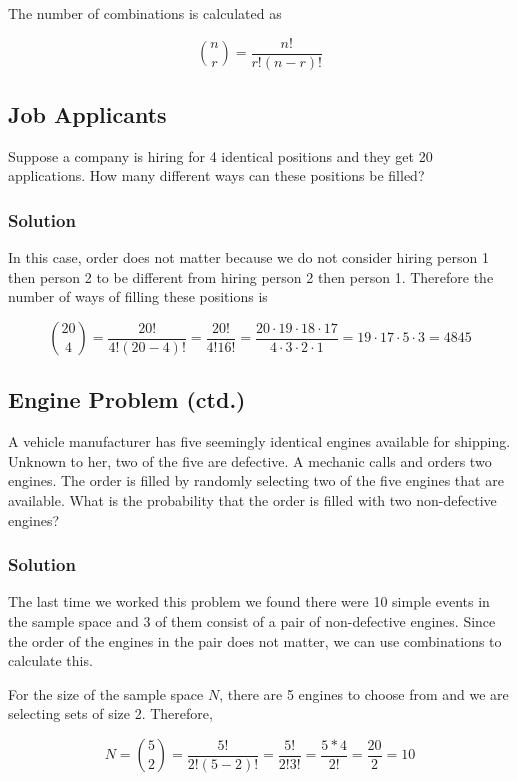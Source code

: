 \documentclass[11pt]{article}
\theoremstyle{definition}
\begin{document}
The number of combinations is calculated as

$$
	{n \choose r} = \frac{n!}{r! (n-r)!}
$$

\subsection{Job Applicants}

Suppose a company is hiring for 4 identical positions and they get 20 applications. How many different ways can these positions be filled?

\subsubsection*{Solution}

In this case, order does not matter because we do not consider hiring person 1  then person 2 to be different from hiring person 2 then person 1. Therefore the number of ways of filling these positions is

$$
	{20 \choose 4} = \frac{20!}{4!(20-4)!} = \frac{20!}{4!16!} = \frac{20 \cdot 19 \cdot 18 \cdot 17}{4 \cdot 3 \cdot 2 \cdot 1} = 19 \cdot 17 \cdot 5 \cdot  3 = 4845
$$

\subsection{Engine Problem (ctd.)}

A vehicle manufacturer has five seemingly identical engines available for shipping. Unknown to her, two of the five are defective. A mechanic calls and orders two engines. The order is filled by randomly selecting two of the five engines that are available. What is the probability that the order is filled with two non-defective engines?

\subsubsection*{Solution}

The last time we worked this problem we found there were 10 simple events in the sample space and 3 of them consist of a pair of non-defective engines. Since the order of the engines in the pair does not matter, we can use combinations to calculate this.

For the size of the sample space $N$, there are 5 engines to choose from and we are selecting sets of size 2. Therefore,

$$
	N = {5 \choose 2} = \frac{5!}{2!(5-2)!} = \frac{5!}{2!3!} = \frac{5*4}{2!} = \frac{20}{2} = 10
$$
\end{document}
